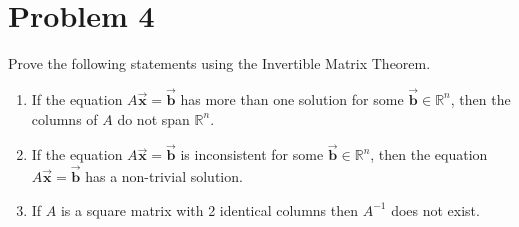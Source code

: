 \documentclass[letter,11pt]{article}
\begin{document}
\section{Problem 4}
Prove the following statements using the Invertible Matrix Theorem.

\begin{enumerate}[label = \roman*.]
    \item If the equation $A \vec{\boldsymbol{x}}=\vec{\boldsymbol{b}}$ has more than one solution for some $\vec{\boldsymbol{b}} \in \mathbb{R}^{n}$, then the columns of $A$ do not span $\mathbb{R}^{n}$.
    \item If the equation $A \vec{\boldsymbol{x}}=\vec{\boldsymbol{b}}$ is inconsistent for some $\vec{\boldsymbol{b}} \in \mathbb{R}^{n}$, then the equation $A \vec{\boldsymbol{x}}=\vec{\boldsymbol{b}}$ has a non-trivial solution.
    \item If $A$ is a square matrix with 2 identical columns then $A^{-1}$ does not exist.
\end{enumerate}
\end{document}
